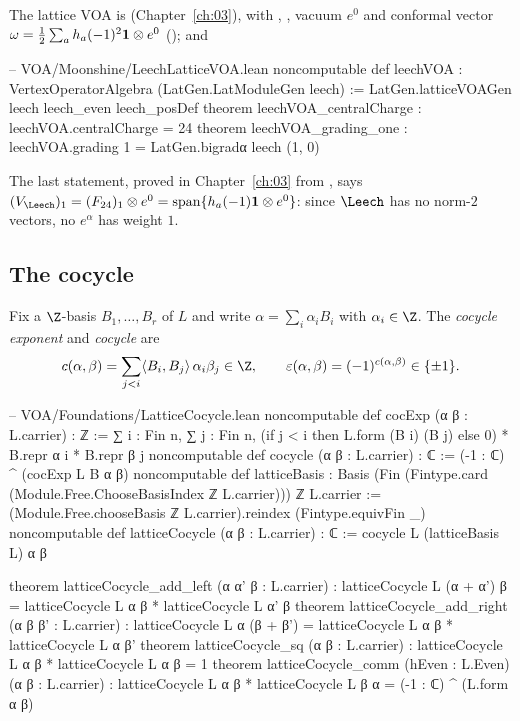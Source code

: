 The lattice VOA is  (Chapter~\ref{ch:03}), with
, , vacuum $e^0$ and conformal
vector $\omega=\tfrac12\sum_a h_a(-1)^2\mathbf{1}\otimes e^0$ (); and
\begin{leancode}
-- VOA/Moonshine/LeechLatticeVOA.lean
noncomputable def leechVOA : VertexOperatorAlgebra (LatGen.LatModuleGen leech) :=
  LatGen.latticeVOAGen leech leech_even leech_posDef
theorem leechVOA_centralCharge : leechVOA.centralCharge = 24
theorem leechVOA_grading_one :
    leechVOA.grading 1 = LatGen.bigradα leech (1, 0)
\end{leancode}
The last statement, proved in Chapter~\ref{ch:03} from , says
$(V_\Leech)_1=(F_{24})_1\otimes e^0=\operatorname{span}\{h_a(-1)\chfourone\otimes e^0\}$: since
$\Leech$ has no norm-$2$ vectors, no $e^\alpha$ has weight $1$.

\subsection{The cocycle}\label{ch04:sec:cocycle}

\begin{definition}\label{ch04:def:cocycle}
Fix a $\Z$-basis $B_1,\dots,B_r$ of $L$ and write $\alpha=\sum_i\alpha_iB_i$ with $\alpha_i\in\Z$.
The \emph{cocycle exponent} and \emph{cocycle} are
\begin{equation*}
  c(\alpha,\beta)=\sum_{j<i}\langle B_i,B_j\rangle\,\alpha_i\beta_j\in\Z,\qquad
  \varepsilon(\alpha,\beta)=(-1)^{c(\alpha,\beta)}\in\{\pm1\}.
\end{equation*}
\end{definition}

\begin{leancode}
-- VOA/Foundations/LatticeCocycle.lean
noncomputable def cocExp (α β : L.carrier) : ℤ :=
  ∑ i : Fin n, ∑ j : Fin n,
    (if j < i then L.form (B i) (B j) else 0) * B.repr α i * B.repr β j
noncomputable def cocycle (α β : L.carrier) : ℂ := (-1 : ℂ) ^ (cocExp L B α β)
noncomputable def latticeBasis :
    Basis (Fin (Fintype.card (Module.Free.ChooseBasisIndex ℤ L.carrier))) ℤ L.carrier :=
  (Module.Free.chooseBasis ℤ L.carrier).reindex (Fintype.equivFin _)
noncomputable def latticeCocycle (α β : L.carrier) : ℂ := cocycle L (latticeBasis L) α β

theorem latticeCocycle_add_left (α α' β : L.carrier) :
    latticeCocycle L (α + α') β = latticeCocycle L α β * latticeCocycle L α' β
theorem latticeCocycle_add_right (α β β' : L.carrier) :
    latticeCocycle L α (β + β') = latticeCocycle L α β * latticeCocycle L α β'
theorem latticeCocycle_sq (α β : L.carrier) :
    latticeCocycle L α β * latticeCocycle L α β = 1
theorem latticeCocycle_comm (hEven : L.Even) (α β : L.carrier) :
    latticeCocycle L α β * latticeCocycle L β α = (-1 : ℂ) ^ (L.form α β)
\end{leancode}

